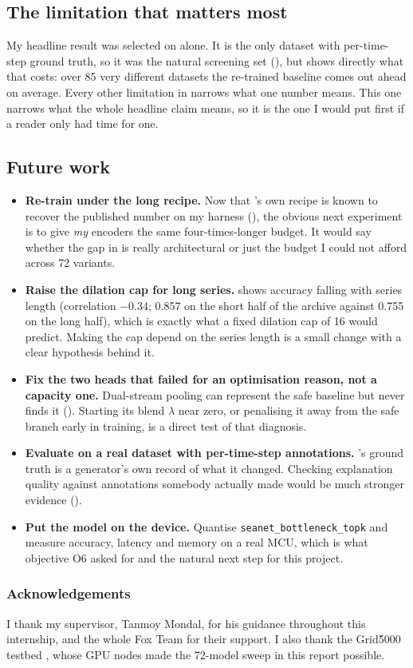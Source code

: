 \subsection*{The limitation that matters most}

My headline result was selected on \webtraffic{} alone. It is the only dataset with per-time-step
ground truth, so it was the natural screening set (), but 
shows directly what that costs: over 85 very different \ucr{} datasets the re-trained baseline comes
out ahead on average. Every other limitation in  narrows what one number
means. This one narrows what the whole headline claim means, so it is the one I would put first if a
reader only had time for one.

\subsection*{Future work}

\begin{itemize}\itemsep4pt
  \item \textbf{Re-train \seanet{} under the long recipe.} Now that \millet{}'s own recipe is known
        to recover the published \ucr{} number on my harness (), the obvious
        next experiment is to give \emph{my} encoders the same four-times-longer budget. It would
        say whether the \ucr{} gap in  is really architectural or just the budget
        I could not afford across 72 variants.
  \item \textbf{Raise the dilation cap for long series.}  shows accuracy falling
        with series length (correlation $-0.34$; 0.857 on the short half of the archive against
        0.755 on the long half), which is exactly what a fixed dilation cap of 16 would predict.
        Making the cap depend on the series length is a small change with a clear hypothesis behind
        it.
  \item \textbf{Fix the two heads that failed for an optimisation reason, not a capacity one.}
        Dual-stream pooling can represent the safe baseline but never finds it
        (). Starting its blend $\lambda$ near zero, or penalising it away
        from the safe branch early in training, is a direct test of that diagnosis.
  \item \textbf{Evaluate on a real dataset with per-time-step annotations.} \webtraffic{}'s ground
        truth is a generator's own record of what it changed. Checking explanation quality against
        annotations somebody actually made would be much stronger evidence
        ().
  \item \textbf{Put the model on the device.} Quantise \texttt{seanet\_bottleneck\_topk} and measure
        accuracy, latency and memory on a real MCU, which is what objective O6 asked for and the
        natural next step for this project.
\end{itemize}

\subsubsection*{Acknowledgements}



I thank my supervisor, Tanmoy Mondal, for his guidance throughout this internship, and the whole Fox Team for their support. I also thank the Grid\' 5000 testbed \citep{balouek2013grid5000}, whose GPU nodes made the 72-model sweep in this report possible.
